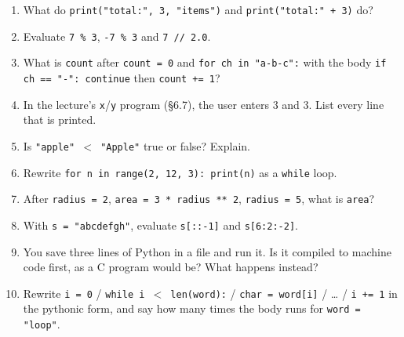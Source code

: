 \documentclass[11pt]{article}
\begin{document}
\begin{keepsection}
\begin{enumerate}
\item What do \texttt{print("total:", 3, "items")} and \texttt{print("total:" + 3)} do?
\item Evaluate \texttt{7 \% 3}, \texttt{-7 \% 3} and \texttt{7 // 2.0}.
\item What is \texttt{count} after \texttt{count = 0} and \texttt{for ch in "a-b-c":} with the body \texttt{if ch == "-": continue} then \texttt{count += 1}?
\item In the lecture’s \texttt{x}/\texttt{y} program (§6.7), the user enters 3 and 3. List every line that is printed.
\item Is \texttt{"apple" \ensuremath{<} "Apple"} true or false? Explain.
\item Rewrite \texttt{for n in range(2, 12, 3): print(n)} as a \texttt{while} loop.
\item After \texttt{radius = 2}, \texttt{area = 3 * radius ** 2}, \texttt{radius = 5}, what is \texttt{area}?
\item With \texttt{s = "abcdefgh"}, evaluate \texttt{s[::-1]} and \texttt{s[6:2:-2]}.
\item You save three lines of Python in a file and run it. Is it compiled to machine code first, as a C program would be? What happens instead?
\item Rewrite \texttt{i = 0} / \texttt{while i \ensuremath{<} len(word):} / \texttt{char = word[i]} / … / \texttt{i += 1} in the pythonic form, and say how many times the body runs for \texttt{word = "loop"}.
\end{enumerate}

\end{keepsection}
\end{document}
